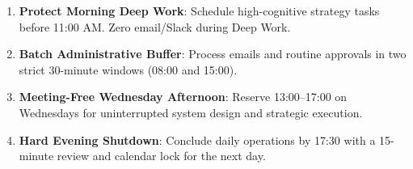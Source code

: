 \documentclass[10pt, landscape]{article}
\begin{document}
\begin{minipage}[t]{0.48\linewidth}
  \begin{tcolorbox}[lightbox, title={\faLightbulb~ TIME-BLOCKING OPERATING RULES}]
    \begin{enumerate}[leftmargin=12pt, label=\bfseries Rule \arabic*:, itemsep=2pt, topsep=1pt]
      \small
      \item \textbf{Protect Morning Deep Work}: Schedule high-cognitive strategy tasks before 11:00 AM. Zero email/Slack during Deep Work.
      \item \textbf{Batch Administrative Buffer}: Process emails and routine approvals in two strict 30-minute windows (08:00 and 15:00).
      \item \textbf{Meeting-Free Wednesday Afternoon}: Reserve 13:00--17:00 on Wednesdays for uninterrupted system design and strategic execution.
      \item \textbf{Hard Evening Shutdown}: Conclude daily operations by 17:30 with a 15-minute review and calendar lock for the next day.
    \end{enumerate}
  \end{tcolorbox}

\end{minipage}%
\hfill
\end{document}
